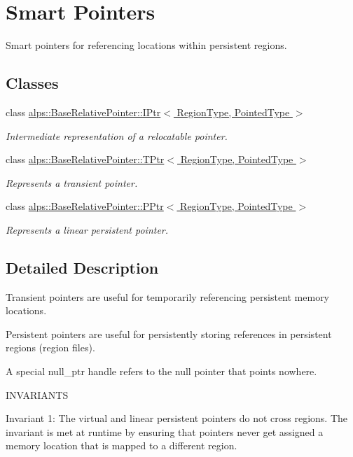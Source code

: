 \hypertarget{group__SMARTPOINTERS}{}\section{Smart Pointers}
\label{group__SMARTPOINTERS}


Smart pointers for referencing locations within persistent regions.  


\subsection*{Classes}
\begin{DoxyCompactItemize}
\item 
class \hyperlink{classalps_1_1BaseRelativePointer_1_1IPtr}{alps\+::\+Base\+Relative\+Pointer\+::\+I\+Ptr$<$ Region\+Type, Pointed\+Type $>$}
\begin{DoxyCompactList}\small\item\em Intermediate representation of a relocatable pointer. \end{DoxyCompactList}\item 
class \hyperlink{classalps_1_1BaseRelativePointer_1_1TPtr}{alps\+::\+Base\+Relative\+Pointer\+::\+T\+Ptr$<$ Region\+Type, Pointed\+Type $>$}
\begin{DoxyCompactList}\small\item\em Represents a transient pointer. \end{DoxyCompactList}\item 
class \hyperlink{classalps_1_1BaseRelativePointer_1_1PPtr}{alps\+::\+Base\+Relative\+Pointer\+::\+P\+Ptr$<$ Region\+Type, Pointed\+Type $>$}
\begin{DoxyCompactList}\small\item\em Represents a linear persistent pointer. \end{DoxyCompactList}\end{DoxyCompactItemize}


\subsection{Detailed Description}
Transient pointers are useful for temporarily referencing persistent memory locations.

Persistent pointers are useful for persistently storing references in persistent regions (region files).

A special null\+\_\+ptr handle refers to the null pointer that points nowhere.

I\+N\+V\+A\+R\+I\+A\+N\+TS
\begin{DoxyItemize}
\item Invariant 1\+: The virtual and linear persistent pointers do not cross regions. The invariant is met at runtime by ensuring that pointers never get assigned a memory location that is mapped to a different region. 
\end{DoxyItemize}